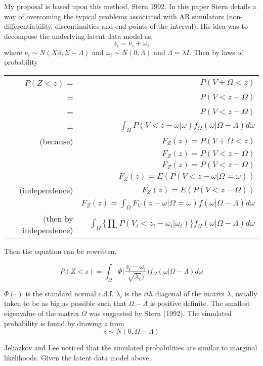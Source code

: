 \documentclass[]{article}
\begin{document}
My proposal is based upon this method, Stern 1992. In this paper Stern details a way of overcoming the typical problems associated with AR simulators (non-differentiability, discontinuities and end points of the interval). His idea was to decompose the underlying latent data model as, 
\[ z_i = \nu_i + \omega_i \]
where $ \nu_i \sim N(X\beta, \Sigma - \Lambda) $ and $ \omega_i \sim N(0, \Lambda) $ and $ \Lambda = \lambda I $. Then by laws of probability \\
\begin{table}[H]
\centering
\begin{tabular}{rr}
 $ P(Z < z) $ = & $ P(V + \Omega < z) $ \\ 
 = &  $ P(V < z - \Omega) $ \\
  = &  $ P(V < z - \Omega) $ \\
= & $ \int_{\Omega} P(V < z - \omega|\omega)f_{\Omega}(\omega|\Omega - \Lambda)d\omega $\\
(because) & $ F_Z(z) = P(V + \Omega < z)  $    \\
& $ F_Z(z) = P(V < z - \Omega)  $ \\
& $ F_Z(z) = P(V < z - \Omega)  $ \\
& $ F_Z(z) = E(P(V < z - \omega|\Omega=\omega))  $ \\
(independence) & $ F_Z(z) = E(P(V < z - \Omega))  $ \\
& $ F_Z(z) = \int_{\Omega}F_V(z - \omega|\Omega= \omega)f(\omega|\Omega - \Lambda)d\omega   $ \\
(then by independence)  & $ \int_{\Omega} \{\prod_i P(V_i < z_i - \omega_i|\omega_i)\}f_{\Omega}(\omega|\Omega - \Lambda)d\omega $\\
\end{tabular}
\end{table}
Then the equation can be rewritten,

\[  P(Z < z)  = \int_{\Omega} \Phi\Big( \frac{z_i - \omega_i}{\sqrt{\lambda_i} )}\Big) f_{\Omega}(\omega|\Omega - \Lambda)  d\omega \]

$ \Phi(\cdot) $ is the standard normal c.d.f. $ \lambda_i $ is  the $ ith $ diagonal of the matrix $ \lambda $, usually taken to be as big as possible such that $ \Omega - \Lambda $ is positive definite. The smallest eigenvalue of the matrix $ \Omega $ was suggested by Stern (1992). The simulated probability is found by drawing $ z $ from 
\[ z \sim N(0,  \Omega - \Lambda ) \]

Jeliazkov and Lee noticed that the simulated probabilities are similar to marginal likelihoods. Given the latent data model above, 
\end{document}
